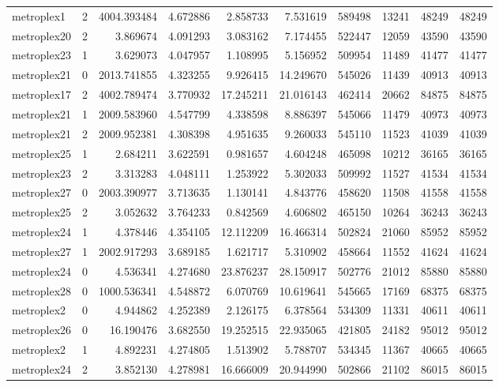 \begin{longtable}{|l|r|r|r|r|r|r|r|r|r|}
metroplex1 & 2 & 4004.393484 & 4.672886 & 2.858733 & 7.531619 & 589498 & 13241 & 48249 & 48249 \\
metroplex20 & 2 & 3.869674 & 4.091293 & 3.083162 & 7.174455 & 522447 & 12059 & 43590 & 43590 \\
metroplex23 & 1 & 3.629073 & 4.047957 & 1.108995 & 5.156952 & 509954 & 11489 & 41477 & 41477 \\
metroplex21 & 0 & 2013.741855 & 4.323255 & 9.926415 & 14.249670 & 545026 & 11439 & 40913 & 40913 \\
metroplex17 & 2 & 4002.789474 & 3.770932 & 17.245211 & 21.016143 & 462414 & 20662 & 84875 & 84875 \\
metroplex21 & 1 & 2009.583960 & 4.547799 & 4.338598 & 8.886397 & 545066 & 11479 & 40973 & 40973 \\
metroplex21 & 2 & 2009.952381 & 4.308398 & 4.951635 & 9.260033 & 545110 & 11523 & 41039 & 41039 \\
metroplex25 & 1 & 2.684211 & 3.622591 & 0.981657 & 4.604248 & 465098 & 10212 & 36165 & 36165 \\
metroplex23 & 2 & 3.313283 & 4.048111 & 1.253922 & 5.302033 & 509992 & 11527 & 41534 & 41534 \\
metroplex27 & 0 & 2003.390977 & 3.713635 & 1.130141 & 4.843776 & 458620 & 11508 & 41558 & 41558 \\
metroplex25 & 2 & 3.052632 & 3.764233 & 0.842569 & 4.606802 & 465150 & 10264 & 36243 & 36243 \\
metroplex24 & 1 & 4.378446 & 4.354105 & 12.112209 & 16.466314 & 502824 & 21060 & 85952 & 85952 \\
metroplex27 & 1 & 2002.917293 & 3.689185 & 1.621717 & 5.310902 & 458664 & 11552 & 41624 & 41624 \\
metroplex24 & 0 & 4.536341 & 4.274680 & 23.876237 & 28.150917 & 502776 & 21012 & 85880 & 85880 \\
metroplex28 & 0 & 1000.536341 & 4.548872 & 6.070769 & 10.619641 & 545665 & 17169 & 68375 & 68375 \\
metroplex2 & 0 & 4.944862 & 4.252389 & 2.126175 & 6.378564 & 534309 & 11331 & 40611 & 40611 \\
metroplex26 & 0 & 16.190476 & 3.682550 & 19.252515 & 22.935065 & 421805 & 24182 & 95012 & 95012 \\
metroplex2 & 1 & 4.892231 & 4.274805 & 1.513902 & 5.788707 & 534345 & 11367 & 40665 & 40665 \\
metroplex24 & 2 & 3.852130 & 4.278981 & 16.666009 & 20.944990 & 502866 & 21102 & 86015 & 86015 \\

\end{longtable}
